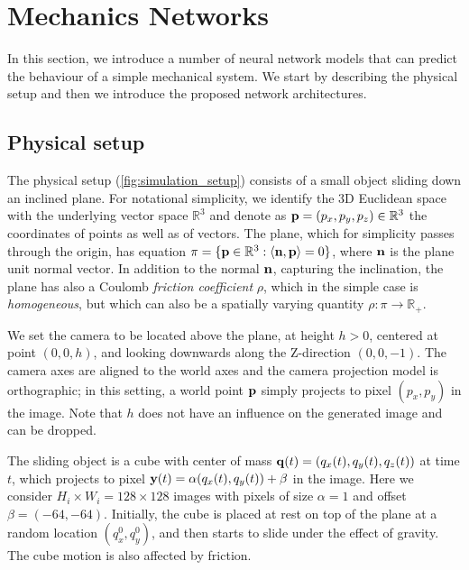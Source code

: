 \section{Mechanics Networks}\label{sec:method}

In this section, we introduce a number of neural network models that can predict the behaviour of a simple mechanical system. We start by describing the physical setup and then we introduce the proposed network architectures.


\subsection{Physical setup}\label{sec:phys}

The physical setup (\cref{fig:simulation_setup}) consists of a small object sliding down an inclined plane. For notational simplicity, we identify the 3D Euclidean space with the underlying vector space $\mathbb{R}^3$ and denote as $\mathbf{p} = (p_x,p_y,p_z)\in\mathbb{R}^3$ the coordinates of points as well as of vectors. The plane, which for simplicity passes through the origin, has equation $\pi= \{\mathbf{p} \in \mathbb{R}^3:\langle \mathbf{n}, \mathbf{p} \rangle = 0\}$, where $\mathbf{n}$ is the plane unit normal vector. In addition to the normal $\mathbf{n}$, capturing the inclination, the plane has also a Coulomb \emph{friction coefficient} $\rho$, which in the simple case is \emph{homogeneous}, but which can also be a spatially varying quantity $\rho : \pi \rightarrow \mathbb{R}_+$.

We set the camera to be located above the plane, at height $h > 0$, centered at point $(0,0,h)$, and looking downwards along the Z-direction $(0,0,-1)$. The camera axes are aligned to the world axes and the camera projection model is orthographic; in this setting, a world point $\mathbf{p}$ simply projects to pixel $(p_x,p_y)$ in the image. Note that $h$ does not have an influence on the generated image and can be dropped.

The sliding object is a cube with center of mass $\mathbf{q}(t) = (q_x(t),q_y(t),q_z(t))$ at time $t$, which projects to pixel $\mathbf{y}(t) = \alpha (q_x(t),q_y(t))+\beta$ in the image. Here we consider $H_i\times W_i = 128 \times 128$ images with pixels of size $\alpha = 1$ and offset $\beta =(-64,-64)$. Initially, the cube is placed at rest on top of the plane at a random location $(q_x^0,q_y^0)$, and then starts to slide under the effect of gravity. The cube motion is also affected by friction. 

